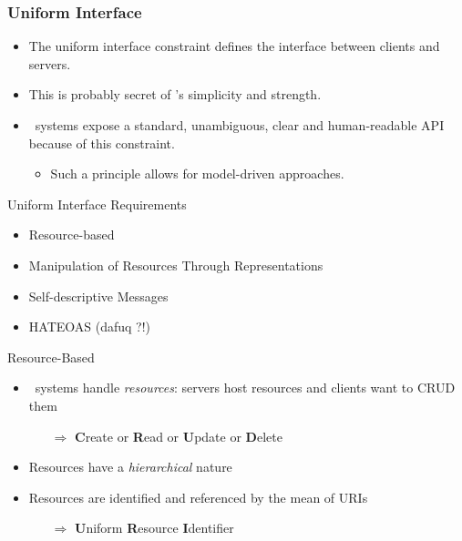 \begin{frame}
	\frametitle{Uniform Interface}
	
	\begin{itemize}
		\item The uniform interface constraint defines the interface between clients and servers. 
		\item This is probably secret of \rest's simplicity and strength.
		\item \restful\ systems expose a standard, unambiguous, clear and human-readable API because of this constraint.
			\begin{itemize}
				\item Such a principle allows for model-driven approaches. 
			\end{itemize}
	\end{itemize}
	
	\begin{block}{Uniform Interface Requirements}
		\begin{itemize}
			\item Resource-based
			\item Manipulation of Resources Through Representations
			\item Self-descriptive Messages
			\item HATEOAS (dafuq ?!)
			
		\end{itemize}
	\end{block}
	
	\framebreak
	
	
	\begin{block}{Resource-Based}
		\begin{itemize}
			\item \restful\ systems handle \emph{resources}: servers host resources and clients want to CRUD them
			\begin{itemize}
				\item[$\Rightarrow$] \textbf{C}reate or \textbf{R}ead or \textbf{U}pdate or \textbf{D}elete
			\end{itemize}
			\item Resources have a \emph{hierarchical} nature
			\item Resources are identified and referenced by the mean of URIs
				\begin{itemize}
					\item[$\Rightarrow$] \textbf{U}niform \textbf{R}esource \textbf{I}dentifier
				\end{itemize}
			

\end{itemize}
\end{block}
\end{frame}

